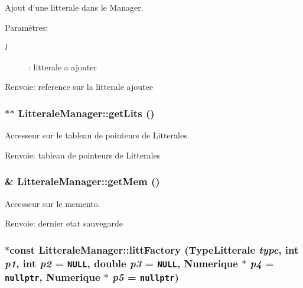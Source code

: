 Ajout d'une litterale dans le Manager. 

\begin{Desc}
\item[Paramètres:]
\begin{description}
\item[{\em l}]: litterale a ajouter \end{description}
\end{Desc}
\begin{Desc}
\item[Renvoie:]reference sur la litterale ajoutee \end{Desc}
\hypertarget{class_litterale_manager_d385d62b811ea974bb98073e5b3ba4b4}{
\subsubsection[{getLits}]{$\ast$$\ast$ LitteraleManager::getLits ()}}
\label{class_litterale_manager_d385d62b811ea974bb98073e5b3ba4b4}


Accesseur sur le tableau de pointeurs de Litterales. 

\begin{Desc}
\item[Renvoie:]tableau de pointeurs de Litterales \end{Desc}
\hypertarget{class_litterale_manager_2dc55ae7c373e339ed59cee0090a781a}{
\subsubsection[{getMem}]{\& LitteraleManager::getMem ()}}
\label{class_litterale_manager_2dc55ae7c373e339ed59cee0090a781a}


Accesseur sur le memento. 

\begin{Desc}
\item[Renvoie:]dernier etat sauvegarde \end{Desc}
\hypertarget{class_litterale_manager_ac254ffc8158f21899786e2133a6018d}{
\subsubsection[{littFactory}]{ $\ast$const LitteraleManager::littFactory (TypeLitterale {\em type}, \/  int {\em p1}, \/  int {\em p2} = {\tt NULL}, \/  double {\em p3} = {\tt NULL}, \/  {\bf Numerique} $\ast$ {\em p4} = {\tt nullptr}, \/  {\bf Numerique} $\ast$ {\em p5} = {\tt nullptr})}}
\label{class_litterale_manager_ac254ffc8158f21899786e2133a6018d}


